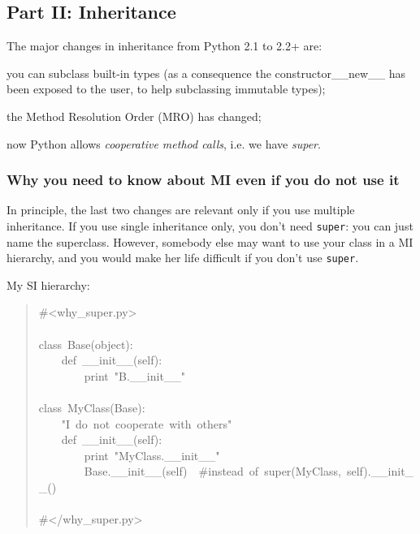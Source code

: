 \documentclass[10pt,a4paper,english]{article}
\begin{document}

\hypertarget{part-ii-inheritance}{}
\subsection*{Part II: Inheritance}

The major changes in inheritance from Python 2.1 to 2.2+ are:
\begin{list}{.}
{
\setlength{\rightmargin}{\leftmargin}
}
\item {} 
you can subclass built-in types (as a consequence the constructor{\_}{\_}new{\_}{\_} 
has been exposed to the user, to help subclassing immutable types);

\item {} 
the Method Resolution Order (MRO) has changed;

\item {} 
now Python allows \emph{cooperative method calls}, i.e. we have \emph{super}.

\end{list}



\hypertarget{why-you-need-to-know-about-mi-even-if-you-do-not-use-it}{}
\subsubsection*{Why you need to know about MI even if you do not use it}

In principle, the last two changes are relevant only if you use multiple 
inheritance. If you use single inheritance only, you don't need \texttt{super}:
you can just name the superclass.
However, somebody else may want to use your class in a MI hierarchy,
and you would make her life difficult if you don't use \texttt{super}.

My SI hierarchy:
\begin{quote}{\ttfamily \raggedright \noindent
{\#}<why{\_}super.py>~\\
~\\
class~Base(object):~\\
~~~~def~{\_}{\_}init{\_}{\_}(self):~\\
~~~~~~~~print~"B.{\_}{\_}init{\_}{\_}"~\\
~\\
class~MyClass(Base):~\\
~~~~"I~do~not~cooperate~with~others"~\\
~~~~def~{\_}{\_}init{\_}{\_}(self):~\\
~~~~~~~~print~"MyClass.{\_}{\_}init{\_}{\_}"~\\
~~~~~~~~Base.{\_}{\_}init{\_}{\_}(self)~~{\#}instead~of~super(MyClass,~self).{\_}{\_}init{\_}{\_}()~\\
~\\
{\#}</why{\_}super.py>
}\end{quote}
\end{document}
